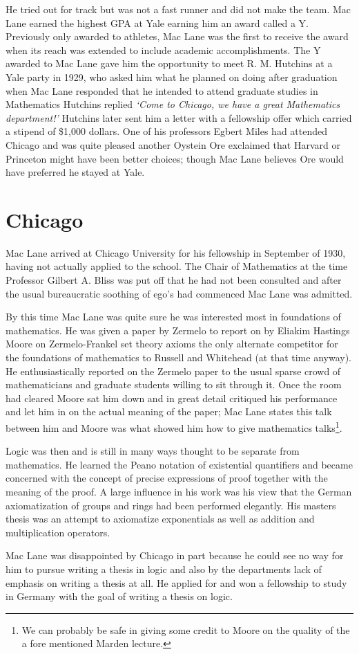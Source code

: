 He tried out for track but was not a fast runner and did not make the team. Mac Lane earned the highest GPA at Yale earning him an award called a Y. Previously only awarded to athletes, Mac Lane was the first to receive the award when its reach was extended to include academic accomplishments. The Y awarded to Mac Lane gave him the opportunity to meet R. M. Hutchins at a Yale party in 1929, who asked him what he planned on doing after graduation when Mac Lane responded that he intended to attend graduate studies in Mathematics Hutchins replied \emph{`Come to Chicago, we have a great Mathematics department!'} Hutchins later sent him a letter with a fellowship offer which carried a stipend of \$1,000 dollars. One of his professors Egbert Miles had attended Chicago and was quite pleased another Oystein Ore exclaimed that Harvard or Princeton might have been better choices; though Mac Lane believes Ore would have preferred he stayed at Yale. 

\section{Chicago}

Mac Lane arrived at Chicago University for his fellowship in September of 1930, having not actually applied to the school. The Chair of Mathematics at the time Professor Gilbert A. Bliss was put off that he had not been consulted and after the usual bureaucratic soothing of ego's had commenced Mac Lane was admitted. 

By this time Mac Lane was quite sure he was interested most in foundations of mathematics. He was given a paper by Zermelo to report on by Eliakim Hastings Moore on Zermelo-Frankel set theory axioms the only alternate competitor for the foundations of mathematics to Russell and Whitehead (at that time anyway). He enthusiastically reported on the Zermelo paper to the usual sparse crowd of mathematicians and graduate students willing to sit through it. Once the room had cleared Moore sat him down and in great detail critiqued his performance and let him in on the actual meaning of the paper; Mac Lane states this talk between him and Moore was what showed him how to give mathematics talks\footnote{We can probably be safe in giving some credit to Moore on the quality of the a fore mentioned Marden lecture.}. 

Logic was then and is still in many ways thought to be separate from mathematics. He learned the Peano notation of existential quantifiers and became concerned with the concept of precise expressions of proof together with the meaning of the proof. A large influence in his work was his view that the German axiomatization of groups and rings had been performed elegantly. His masters thesis was an attempt to axiomatize exponentials as well as addition and multiplication operators. 

Mac Lane was disappointed by Chicago in part because he could see no way for him to pursue writing a thesis in logic and also by the departments lack of emphasis on writing a thesis at all. He applied for and won a fellowship to study in Germany with the goal of writing a thesis on logic. 


